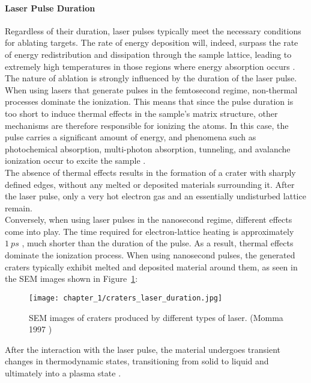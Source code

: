 \paragraph{Laser Pulse Duration}
\label{par:laser_pulse_duration_setup_component}
Regardless of their duration, laser pulses typically meet the necessary conditions for ablating targets. The rate of energy deposition will, indeed, surpass the rate of energy redistribution and dissipation through the sample lattice, leading to extremely high temperatures in those regions where energy absorption occurs \cite{fortesLaserinducedBreakdownSpectroscopy2013}.
\\
The nature of ablation is strongly influenced by the duration of the laser pulse.
When using lasers that generate pulses in the femtosecond regime, non-thermal processes dominate the ionization. This means that since the pulse duration is too short to induce thermal effects in the sample's matrix structure, other mechanisms are therefore responsible for ionizing the atoms. In this case, the pulse carries a significant amount of energy, and phenomena such as photochemical absorption, multi-photon absorption, tunneling, and avalanche ionization occur to excite the sample \cite{singhPreface2007}. 
\\
The absence of thermal effects results in the formation of a crater with sharply defined edges, without any melted or deposited materials surrounding it. After the laser pulse, only a very hot electron gas and an essentially undisturbed lattice remain.
\\
Conversely, when using laser pulses in the nanosecond regime, different effects come into play. The time required for electron-lattice heating is approximately $1\:ps$ \cite{anabitarteLaserInducedBreakdownSpectroscopy2012}, much shorter than the duration of the pulse. As a result, thermal effects dominate the ionization process. When using nanosecond pulses, the generated craters typically exhibit melted and deposited material around them, as seen in the SEM images shown in Figure~\ref{fig:craters_laser_duration}:
\begin{figure}[H]
    \centering
    \texttt{[image: chapter\_1/craters\_laser\_duration.jpg]}
    \caption{SEM images of craters produced by different types of laser. (Momma 1997 \cite{mommaPreciseLaserAblation1997})}
    \label{fig:craters_laser_duration}
\end{figure}
After the interaction with the laser pulse, the material undergoes transient changes in thermodynamic states, transitioning from solid to liquid and ultimately into a plasma state \cite{fortesLaserinducedBreakdownSpectroscopy2013}.
